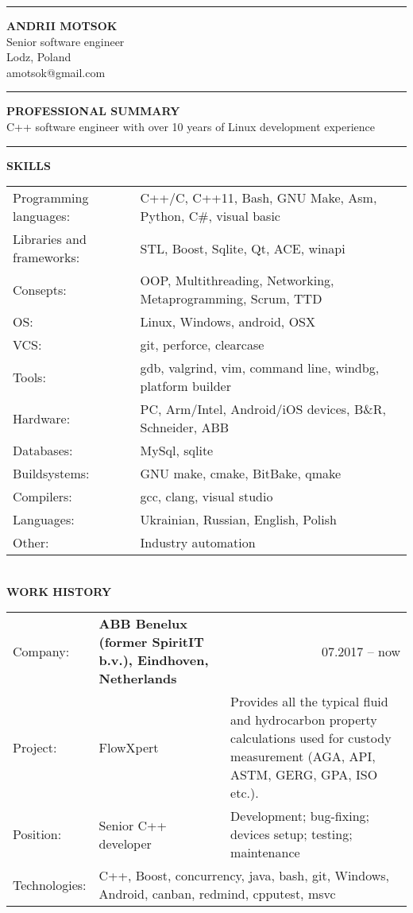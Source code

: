 \documentclass{article}
\begin{document}
\noindent\hrule height 5pt \vspace{4mm} \noindent
{\selectfont\huge{\textbf{ANDRII MOTSOK}}} \\
{\color{lightgray}Senior software engineer\\Lodz, Poland}\\
{\color{cyan}amotsok@gmail.com}\\
{\color{lightgray}\hrule height 0.2mm}
\vspace{2mm}
\noindent
\textbf{PROFESSIONAL SUMMARY}\\
C++ software engineer with over 10 years of Linux development experience\\
{\color{lightgray}\hrule height 0.2mm} \vspace{2mm}
\noindent
\textbf{SKILLS}\\
\noindent\begin{tabular}{@{}ll}
  Programming languages: & C++/C, C++11, Bash, GNU Make, Asm, Python, C\#, visual basic\\
  Libraries and frameworks: & STL, Boost, Sqlite, Qt, ACE, winapi\\
  Consepts: & OOP, Multithreading, Networking, Metaprogramming, Scrum, TTD\\
  OS: & Linux, Windows, android, OSX\\
  VCS: & git, perforce, clearcase\\
  Tools: & gdb, valgrind, vim, command line, windbg, platform builder\\
  Hardware: & PC, Arm/Intel, Android/iOS devices, B\&R, Schneider, ABB\\
  Databases: &MySql, sqlite\\
  Buildsystems: &GNU make, cmake, BitBake, qmake\\
  Compilers: &gcc, clang, visual studio\\
  Languages: &Ukrainian, Russian, English, Polish\\
  Other: &  Industry automation\\
\end{tabular}\\
\vspace{2mm}
\noindent \textbf{WORK HISTORY}\\[2mm]
\noindent\begin{tabular}{@{}lp{45mm}p{115mm}}
  Company: & \textbf{ABB Benelux (former SpiritIT b.v.), Eindhoven, Netherlands} & \multicolumn{1}{r}{07.2017 -- now}\\
  Project: & FlowXpert& Provides all the typical fluid and hydrocarbon property calculations used for custody measurement (AGA, API, ASTM, GERG, GPA, ISO etc.).\\
  Position: & Senior C++ developer& Development; bug-fixing; devices setup; testing; maintenance\\
  Technologies: & \multicolumn{2}{p{160mm}}{C++, Boost, concurrency, java, bash, git, Windows, Android, canban, redmind, cpputest, msvc}\\
\end{tabular}\\[7mm]
\end{document}
